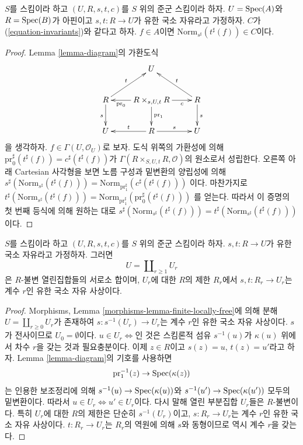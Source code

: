 \begin{lemma}
\label{lemma-determinant-trick}
$S$를 스킴이라 하고 $(U, R, s, t, c)$를 $S$ 위의 준군 스킴이라 하자. $U = \mathop{\mathrm{Spec}}(A)$와 $R = \mathop{\mathrm{Spec}}(B)$가
아핀이고 $s, t : R \to U$가 유한 국소 자유라고 가정하자. $C$가 (\ref{equation-invariants})와 같다고 하자.
$f \in A$이면 $\text{Norm}_{s^\sharp}(t^\sharp(f)) \in C$이다.
\end{lemma}

\begin{proof}
Lemma \ref{lemma-diagram}의 가환도식
$$
\xymatrix{
& U & \\
R \ar[d]_s \ar[ru]^t &
R \times_{s, U, t} R
\ar[l]^-{\text{pr}_0} \ar[d]^{\text{pr}_1} \ar[r]_-c &
R \ar[d]^s \ar[lu]_t \\
U & R \ar[l]_t \ar[r]^s & U
}
$$
을 생각하자. $f \in \Gamma(U, \mathcal{O}_U)$로 보자. 도식 위쪽의 가환성에 의해
$\text{pr}_0^\sharp(t^\sharp(f)) = c^\sharp(t^\sharp(f))$가
$\Gamma(R \times_{S, U, t} R, \mathcal{O})$의 원소로서 성립한다. 오른쪽 아래 Cartesian 사각형을 보면
노름 구성과 밑변환의 양립성에 의해
$s^\sharp(\text{Norm}_{s^\sharp}(t^\sharp(f))) =
\text{Norm}_{\text{pr}_1^\sharp}(c^\sharp(t^\sharp(f)))$
이다. 마찬가지로
$t^\sharp(\text{Norm}_{s^\sharp}(t^\sharp(f))) =
\text{Norm}_{\text{pr}_1^\sharp}(\text{pr}_0^\sharp(t^\sharp(f)))$
를 얻는다. 따라서 이 증명의 첫 번째 등식에 의해 원하는 대로
$s^\sharp(\text{Norm}_{s^\sharp}(t^\sharp(f))) =
t^\sharp(\text{Norm}_{s^\sharp}(t^\sharp(f)))$이다.
\end{proof}

\begin{lemma}
\label{lemma-finite-locally-free-disjoint-free}
$S$를 스킴이라 하고 $(U, R, s, t, c)$를 $S$ 위의 준군 스킴이라 하자. $s, t : R \to U$가 유한 국소 자유라고 가정하자.
그러면
$$
U = \coprod\nolimits_{r \geq 1} U_r
$$
은 $R$-불변 열린집합들의 서로소 합이며, $U_r$에 대한 $R$의 제한 $R_r$에서
$s, t : R_r \to U_r$는 계수 $r$인 유한 국소 자유 사상이다.
\end{lemma}

\begin{proof}
Morphisms, Lemma \ref{morphisms-lemma-finite-locally-free}에 의해 분해
$U = \coprod\nolimits_{r \geq 0} U_r$가 존재하여 $s : s^{-1}(U_r) \to U_r$는 계수 $r$인 유한 국소 자유 사상이다.
$s$가 전사이므로 $U_0 = \emptyset$이다. $u \in U_r \Leftrightarrow$인 것은 스킴론적 섬유 $s^{-1}(u)$가
$\kappa(u)$ 위에서 차수 $r$을 갖는 것과 필요충분이다. 이제 $z \in R$이고 $s(z) = u$, $t(z) = u'$라고 하자.
Lemma \ref{lemma-diagram}의 기호를 사용하면
$$
\text{pr}_1^{-1}(z) \to \mathop{\mathrm{Spec}}(\kappa(z))
$$
는 인용한 보조정리에 의해 $s^{-1}(u) \to \mathop{\mathrm{Spec}}(\kappa(u))$와
$s^{-1}(u') \to \mathop{\mathrm{Spec}}(\kappa(u'))$ 모두의 밑변환이다. 따라서
$u \in U_r \Leftrightarrow u' \in U_r$이다. 다시 말해 열린 부분집합 $U_r$들은 $R$-불변이다. 특히 $U_r$에 대한
$R$의 제한은 단순히 $s^{-1}(U_r)$이고, $s : R_r \to U_r$는 계수 $r$인 유한 국소 자유 사상이다.
$t : R_r \to U_r$는 $R_r$의 역원에 의해 $s$와 동형이므로 역시 계수 $r$을 갖는다.
\end{proof}

